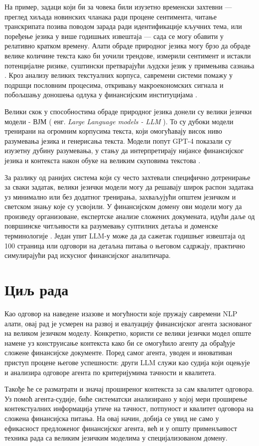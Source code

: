 На пример, задаци који би за човека били изузетно временски захтевни — преглед хиљада новинских чланака ради процене сентимента, читање транскрипата позива поводом зарада ради идентификације кључних тема, или поређење језика у више годишњих извештаја — сада се могу обавити у релативно кратком времену. Алати обраде природног језика могу брзо да обраде велике количине текста како би уочили трендове, измерили сентимент и истакли потенцијалне ризике, суштински претварајући људски језик у примењива сазнања \cite{paro_ai_strategic_2023}. Кроз анализу великих текстуалних корпуса, савремени системи помажу у подршци пословним процесима, откривању макроекономских сигнала и побољшању доношења одлука у финансијским институцијама \cite{yang_evaluating_2025}.
\newline

Велики скок у способностима обраде природног језика донели су велики језички модели - ВЈМ ( енг. \textit{Large Language models - LLM} ). То су дубоки модели тренирани на огромним корпусима текста, који омогућавају висок ниво разумевања језика и генерисања текста. Модели попут GPT-4 показали су изузетну дубину разумевања, у стању да интерпретирају нијансе финансијског језика и контекста након обуке на великим скуповима текстова \cite{paro_ai_strategic_2023}. 
\newline

За разлику од ранијих система који су често захтевали специфично дотренирање за сваки задатак, велики језички модели могу да решавају широк распон задатака уз минимално или без додатног тренирања, захваљујући општем језичком и светском знању које су усвојили. У финансијском домену ови модели могу да произведу организоване, експертске анализе сложених докумената, идући даље од површинске читљивости ка разумевању суптилних детаља и доменске терминологије \cite{yang_evaluating_2025}. Један упит LLM-у може да да сажетак годишњег извештаја од 100 страница или одговори на детаљна питања о његовом садржају, практично симулирајући рад искусног финансијског аналитичара.

\section{Циљ рада}
Као одговор на наведене изазове и могућности које пружају савремени NLP алати, овај рад је усмерен на развој и евалуацију финансијског агента заснованог на великом језичком моделу. Конкретно, користи се велики језички модел опште намене уз конструисање контекста како би се омогућило агенту да обрађује сложене финансијске документе. Поред самог агента, уводен и иновативан приступ процене његове успешности: други LLM служи као судија који оцењује и анализира одговоре агента по критеријумима тачности и квалитета. 
\newline

Такође ће се разматрати и значај проширеног контекста за сам квалитет одговора. Уз помоћ агента-судије, биће систематски анализирано у којој мери проширење контекстуалних информација утиче на тачност, потпуност и квалитет одговора на сложена финансијска питања. На овај начин, добија се увид не само у ефикасност предложеног финансијског агента, већ и у општу применљивост техника рада са великим језичким моделима у специјализованом домену.